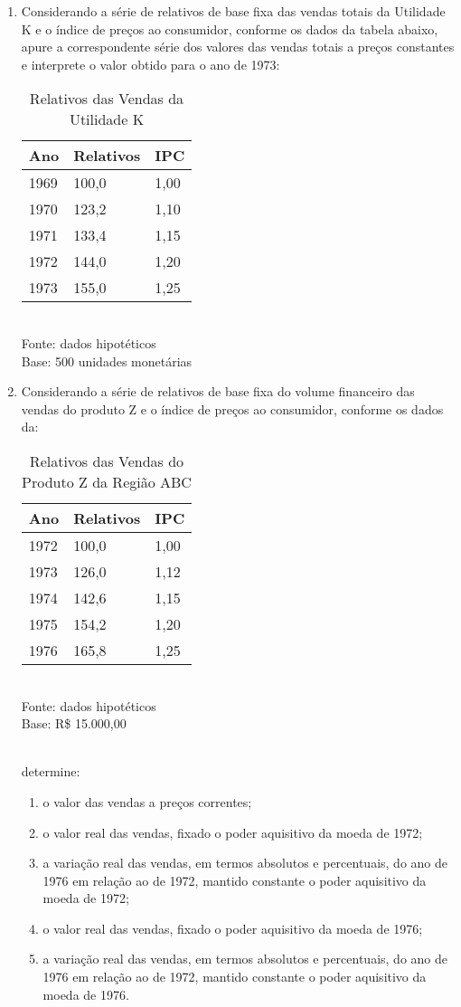\begin{enumerate}[resume]
\item Considerando a série de relativos de base fixa das vendas totais da Utilidade K e o índice de preços ao consumidor, conforme os dados da tabela abaixo, apure a correspondente série dos valores das vendas totais a preços constantes e interprete o valor obtido para o ano de 1973:
	\begin{table}[!htb]
	\centering
	\caption{Relativos das Vendas da Utilidade K}
	\vspace{0.5cm}
	\begin{tabular}{lll}
	Ano & Relativos & IPC \\
	\hline 
	1969 & 100,0 & 1,00  \\
	1970 & 123,2 & 1,10  \\
	1971 & 133,4 & 1,15  \\
	1972 & 144,0 & 1,20  \\
	1973 & 155,0 & 1,25  \\	
	\end{tabular}\\
	Fonte: dados hipotéticos\\
	Base: 500 unidades monetárias
	\end{table}			
	
\item Considerando a série de relativos de base fixa do volume financeiro das vendas do produto Z e o índice de preços ao consumidor, conforme os dados da:
	\begin{table}[!htb]
	\centering
	\caption{Relativos das Vendas do Produto Z da Região ABC}
	\vspace{0.5cm}
	\begin{tabular}{lll}
	Ano & Relativos & IPC \\
	\hline 
	1972 & 100,0 & 1,00  \\
	1973 & 126,0 & 1,12  \\
	1974 & 142,6 & 1,15  \\
	1975 & 154,2 & 1,20  \\			
	1976 & 165,8 & 1,25  \\
	\end{tabular}\\
	Fonte: dados hipotéticos\\
	Base: R\$ 15.000,00
	\end{table}	
	\\
	determine:	
	\begin{enumerate}
	\item o valor das vendas a preços correntes;
	\item o valor real das vendas, fixado o poder aquisitivo da moeda de 1972;
	\item a variação real das vendas, em termos absolutos e percentuais, do ano de 1976 em relação ao de 1972, mantido constante o poder aquisitivo da moeda de 1972;
	\item o valor real das vendas, fixado o poder aquisitivo da moeda de 1976;
	\item a variação real das vendas, em termos absolutos e percentuais, do ano de 1976 em relação ao de 1972, mantido constante o poder aquisitivo da moeda de 1976.
	\end{enumerate}


\end{enumerate}
